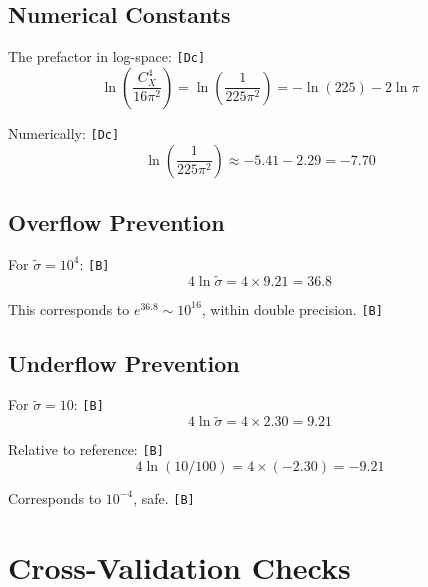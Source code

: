 \documentclass[11pt,a4paper]{article}
\newcommand{\tagDc}{\textcolor{blue!70!black}{\texttt{[Dc]}}}
\newcommand{\tagB}{\textcolor{purple!70!black}{\texttt{[B]}}}
\theoremstyle{definition}
\begin{document}
\subsection{Numerical Constants}
\label{subsec:num-const}

The prefactor in log-space: \tagDc{}
\begin{equation}
\label{eq:log-prefactor}
\ln\left(\frac{C_X^4}{16\pi^2}\right) = \ln\left(\frac{1}{225\pi^2}\right) = -\ln(225) - 2\ln\pi
\end{equation}

Numerically: \tagDc{}
\begin{equation}
\label{eq:log-prefactor-num}
\ln\left(\frac{1}{225\pi^2}\right) \approx -5.41 - 2.29 = -7.70
\end{equation}

\subsection{Overflow Prevention}
\label{subsec:overflow}

For $\tilde{\sigma} = 10^4$: \tagB{}
\begin{equation}
\label{eq:overflow-check}
4\ln\tilde{\sigma} = 4 \times 9.21 = 36.8
\end{equation}

This corresponds to $e^{36.8} \sim 10^{16}$, within double precision. \tagB{}

\subsection{Underflow Prevention}
\label{subsec:underflow}

For $\tilde{\sigma} = 10$: \tagB{}
\begin{equation}
\label{eq:underflow-check}
4\ln\tilde{\sigma} = 4 \times 2.30 = 9.21
\end{equation}

Relative to reference: \tagB{}
\begin{equation}
\label{eq:relative-underflow}
4\ln(10/100) = 4 \times (-2.30) = -9.21
\end{equation}

Corresponds to $10^{-4}$, safe. \tagB{}

\section{Cross-Validation Checks}
\label{sec:cross-val}
\end{document}
